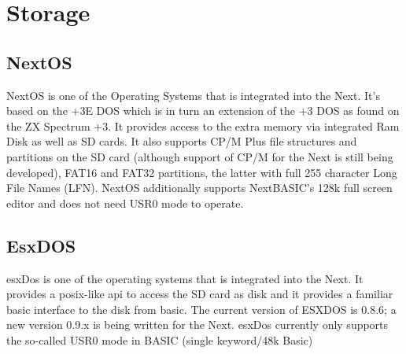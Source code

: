\chapter{Storage}
\section{NextOS}
NextOS is one of the Operating Systems that is integrated into the
Next. It's based on the +3E DOS which is in turn an extension of the
+3 DOS as found on the ZX Spectrum +3. It provides access to the extra
memory via integrated Ram Disk as well as SD cards. It also supports
CP/M Plus file structures and partitions on the SD card (although
support of CP/M for the Next is still being developed), FAT16 and
FAT32 partitions, the latter with full 255 character Long File Names
(LFN). NextOS additionally supports NextBASIC's 128k full screen
editor and does not need USR0 mode to operate.

\section{EsxDOS}
esxDos is one of the operating systems that is integrated into the
Next. It provides a posix-like api to access the SD card as disk and
it provides a familiar basic interface to the disk from basic. The
current version of ESXDOS is 0.8.6; a new version 0.9.x is being
written for the Next. esxDos currently only supports the so-called
USR0 mode in BASIC (single keyword/48k Basic)

